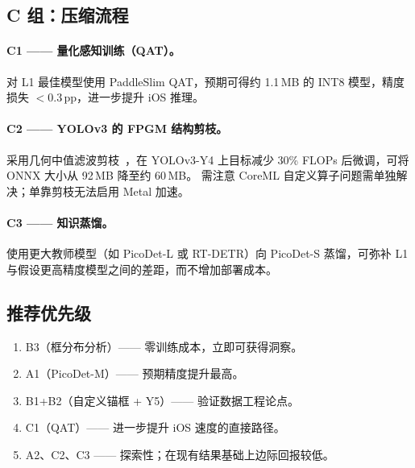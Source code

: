 \subsection{C 组：压缩流程}

\paragraph{C1 —— 量化感知训练（QAT）。}
对 L1 最佳模型使用 PaddleSlim QAT，预期可得约 1.1\,MB 的 INT8 模型，精度损失 $<$0.3\,pp，进一步提升 iOS 推理。

\paragraph{C2 —— YOLOv3 的 FPGM 结构剪枝。}
采用几何中值滤波剪枝~\citep{he2019filter}，在 YOLOv3-Y4 上目标减少 30\% FLOPs 后微调，可将 ONNX 大小从 92\,MB 降至约 60\,MB。
需注意 CoreML 自定义算子问题需单独解决；单靠剪枝无法启用 Metal 加速。

\paragraph{C3 —— 知识蒸馏。}
使用更大教师模型（如 PicoDet-L 或 RT-DETR）向 PicoDet-S 蒸馏，可弥补 L1 与假设更高精度模型之间的差距，而不增加部署成本。

\subsection{推荐优先级}

\begin{enumerate}[leftmargin=1.5em]
  \item B3（框分布分析）—— 零训练成本，立即可获得洞察。
  \item A1（PicoDet-M）—— 预期精度提升最高。
  \item B1+B2（自定义锚框 + Y5）—— 验证数据工程论点。
  \item C1（QAT）—— 进一步提升 iOS 速度的直接路径。
  \item A2、C2、C3 —— 探索性；在现有结果基础上边际回报较低。
\end{enumerate}
